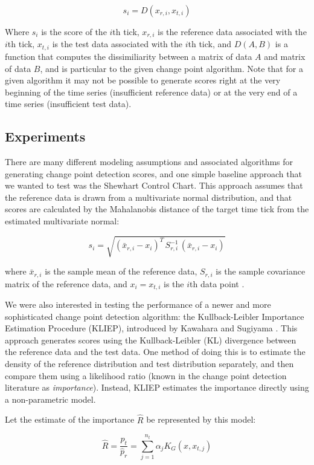 \[
s_i = D(x_{r,i}, x_{t,i})
\]

Where $s_i$ is the score of the $i$th tick, $x_{r,i}$ is the reference
data associated with the $i$th tick, $x_{t,i}$ is the test data
associated with the $i$th tick, and $D(A,B)$ is a function that computes the
dissimiliarity between a matrix of data $A$ and matrix of data $B$, and is
particular to the given change point algorithm. Note that for a given
algorithm it may not be possible to generate scores right at the very beginning
of the time series (insufficient reference data) or at the very end of a time
series (insufficient test data).

\subsection{Experiments}

There are many different modeling assumptions and associated algorithms
for generating change point detection scores, and one simple baseline approach that we 
wanted to test was the Shewhart Control Chart. This approach assumes that the reference data is drawn from a
multivariate normal distribution, and that scores are calculated by the Mahalanobis
distance of the target time tick from the estimated multivariate normal:

\[
s_i = \sqrt{(\bar{x}_{r,i} - x_i)^T \, S_{r,i}^{-1} \, (\bar{x}_{r,i} - x_i)}
\]

where $\bar{x}_{r,i}$ is the sample mean of the reference data, $S_{r,i}$
is the sample covariance matrix of the reference data, and $x_i=x_{t,i}$ is
the $i$th data point \cite{shewhart26}.

We were also interested in testing the performance of a newer and more
sophisticated change point detection algorithm: the
Kullback-Leibler Importance Estimation Procedure (KLIEP),
introduced by Kawahara and Sugiyama \cite{sugiyama09} \cite{sugiyama08}.
This approach generates scores using the Kullback-Leibler (KL)
divergence between the reference data and the test data. One method of doing this
is to estimate the density of the reference distribution and test distribution
separately, and then compare them using a likelihood ratio
(known in the change point detection literature as \emph{importance}). 
Instead, KLIEP estimates the importance directly using a non-parametric model.

Let the estimate of the importance $\hat{R}$ be represented by this model:

\[
\hat{R} = \frac{p_{t}}{\hat{p}_{r}} = \sum_{j=1}^{n_{t}} \alpha_j K_G(x,x_{t,j})
\]

